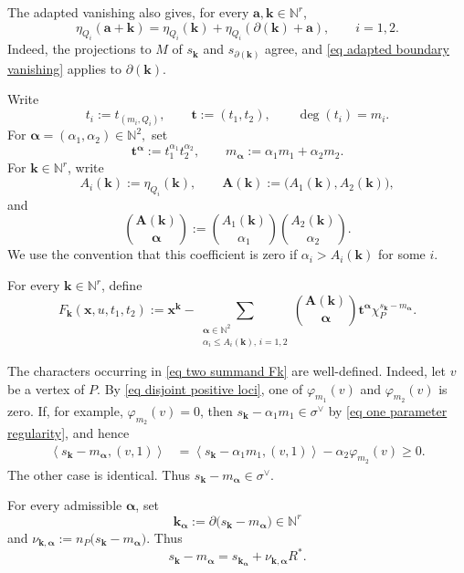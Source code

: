 \documentclass[11pt]{amsart}
\numberwithin{equation}{section}
\theoremstyle{plain}
\theoremstyle{definition}
\newcommand{\0}{$0$-mutable}
\newcommand{\NN}{\ensuremath{\mathbb{N}}}
\newcommand{\bfa}{\ensuremath{\mathbf{a}}}
\newcommand{\bfk}{\ensuremath{\mathbf{k}}}
\newcommand{\bfx}{\ensuremath{\mathbf{x}}}
\renewcommand{\1}{$1$-rigid}
\renewcommand{\0}{$0$-mutable}
\begin{document}
The adapted vanishing also gives, for every
\(\bfa,\bfk\in\NN^r\),
\begin{equation}\label{eq adapted eta additivity}
\eta_{Q_i}(\bfa+\bfk)
=
\eta_{Q_i}(\bfk)
+
\eta_{Q_i}(\partial(\bfk)+\bfa),
\qquad i=1,2.
\end{equation}
Indeed, the projections to \(M\) of \(s_{\bfk}\) and
\(s_{\partial(\bfk)}\) agree, and
\eqref{eq adapted boundary vanishing} applies to
\(\partial(\bfk)\).


Write
\[
t_i:=t_{(m_i,Q_i)},
\qquad
\mathbf t:=(t_1,t_2),
\qquad
\deg(t_i)=m_i.
\]
For
$
\boldsymbol\alpha=(\alpha_1,\alpha_2)\in\NN^2,
$
set
\[
\mathbf t^{\boldsymbol\alpha}
:=
t_1^{\alpha_1}t_2^{\alpha_2},
\qquad
m_{\boldsymbol\alpha}
:=
\alpha_1m_1+\alpha_2m_2.
\]
For \(\bfk\in\NN^r\), write
\[
A_i(\bfk):=\eta_{Q_i}(\bfk),
\qquad
\mathbf A(\bfk):=
\bigl(A_1(\bfk),A_2(\bfk)\bigr),
\]
and
\[
\binom{\mathbf A(\bfk)}{\boldsymbol\alpha}
:=
\binom{A_1(\bfk)}{\alpha_1}
\binom{A_2(\bfk)}{\alpha_2}.
\]
We use the convention that this coefficient is zero if
\(\alpha_i>A_i(\bfk)\) for some \(i\).

For every \(\bfk\in\NN^r\), define
\begin{equation}
\label{eq two summand Fk}
F_{\bfk}(\bfx,u,t_1,t_2)
:=
\bfx^{\bfk}
-
\sum_{\substack{\boldsymbol\alpha\in\NN^2\\
\alpha_i\leq A_i(\bfk),\,i=1,2}}
\binom{\mathbf A(\bfk)}{\boldsymbol\alpha}
\mathbf t^{\boldsymbol\alpha}
\chi_P^{s_{\bfk}-m_{\boldsymbol\alpha}}.
\end{equation}

The characters occurring in \eqref{eq two summand Fk} are well-defined.
Indeed, let \(v\) be a vertex of \(P\). By
\eqref{eq disjoint positive loci}, one of
\(\varphi_{m_1}(v)\) and \(\varphi_{m_2}(v)\) is zero. If, for example,
\(\varphi_{m_2}(v)=0\), then
$
s_{\bfk}-\alpha_1m_1\in\sigma^\vee
$
by \eqref{eq one parameter regularity}, and hence
\[
\begin{aligned}
\left\langle
s_{\bfk}-m_{\boldsymbol\alpha},(v,1)
\right\rangle
&=
\left\langle
s_{\bfk}-\alpha_1m_1,(v,1)
\right\rangle
-
\alpha_2\varphi_{m_2}(v)
\geq0.
\end{aligned}
\]
The other case is identical. Thus
$
s_{\bfk}-m_{\boldsymbol\alpha}\in\sigma^\vee.
$

For every admissible \(\boldsymbol\alpha\), set
\[
\mathbf k_{\boldsymbol\alpha}
:=
\partial\bigl(s_{\mathbf k}-m_{\boldsymbol\alpha}\bigr)
\in\NN^r
\]
and
$
\nu_{\mathbf k,\boldsymbol\alpha}
:=
n_P\bigl(s_{\mathbf k}-m_{\boldsymbol\alpha}\bigr).
$
Thus
\begin{equation} \label{eq two summand boundary decomposition}
s_{\mathbf k}-m_{\boldsymbol\alpha}
=
s_{\mathbf k_{\boldsymbol\alpha}}
+
\nu_{\mathbf k,\boldsymbol\alpha}R^*.
\end{equation}
\end{document}
